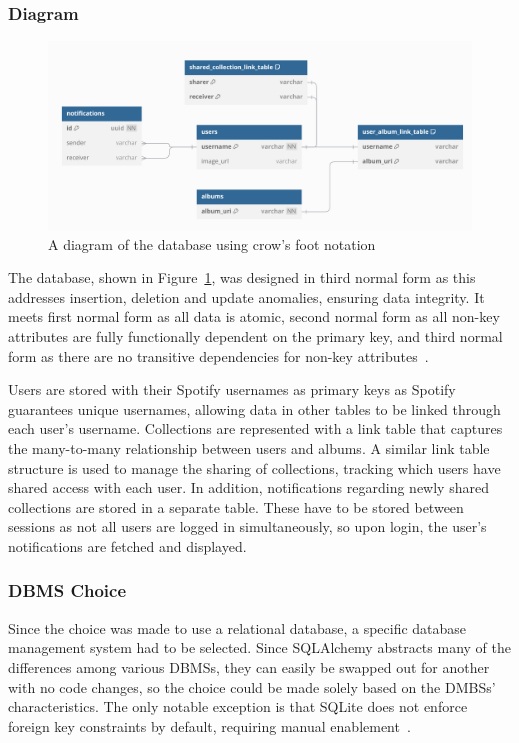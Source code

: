 \subsubsection{Diagram}
\begin{figure} [H]
    \centering
    \includegraphics[width=0.6\linewidth]{figures/db_diagram.png}
    \caption{A diagram of the database using crow's foot notation}
    \label{fig:database-diagram}
\end{figure}

The database, shown in Figure~\ref{fig:database-diagram}, was designed in third normal form as this addresses insertion, deletion and update anomalies, ensuring data integrity. It meets first normal form as all data is atomic, second normal form as all non-key attributes are fully functionally dependent on the primary key, and third normal form as there are no transitive dependencies for non-key attributes~\cite{10.1145/320493.320489}.

Users are stored with their Spotify usernames as primary keys as Spotify guarantees unique usernames, allowing data in other tables to be linked through each user's username. Collections are represented with a link table that captures the many-to-many relationship between users and albums. A similar link table structure is used to manage the sharing of collections, tracking which users have shared access with each user. In addition, notifications regarding newly shared collections are stored in a separate table. These have to be stored between sessions as not all users are logged in simultaneously, so upon login, the user's notifications are fetched and displayed.

\subsubsection{DBMS Choice}
Since the choice was made to use a relational database, a specific database management system had to be selected. Since SQLAlchemy abstracts many of the differences among various DBMSs, they can easily be swapped out for another with no code changes, so the choice could be made solely based on the DMBSs' characteristics. The only notable exception is that SQLite does not enforce foreign key constraints by default, requiring manual enablement~\cite{SQLiteForeignKeys}.

